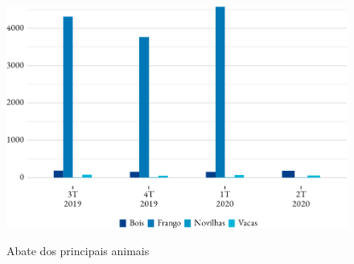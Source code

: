 \begin{figure}[!h]
	\caption{Abate dos principais animais}
	\includegraphics{fig/abates-1.pdf}
	\label{fig:abate}
	\notes{\trimestres}
\end{figure}
